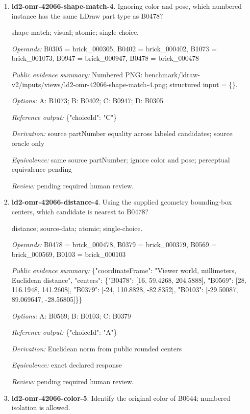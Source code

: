 \begin{enumerate}
\item \textbf{ld2-omr-42066-shape-match-4}. Ignoring color and pose, which numbered instance has the same LDraw part type as B0478?
\par{\small shape-match; visual; atomic; single-choice.\par\textit{Operands:} B0305 = brick\_000305, B0402 = brick\_000402, B1073 = brick\_001073, B0947 = brick\_000947, B0478 = brick\_000478\par\textit{Public evidence summary:} Numbered PNG: benchmark/ldraw-v2/inputs/views/ld2-omr-42066-shape-match-4.png; structured input = \{\}.\par\textit{Options:} A: B1073; B: B0402; C: B0947; D: B0305\par\textit{Reference output:} \{"choiceId": "C"\}\par\textit{Derivation:} source partNumber equality across labeled candidates; source oracle only\par\textit{Equivalence:} same source partNumber; ignore color and pose; perceptual equivalence pending\par\textit{Review:} pending required human review.}
\item \textbf{ld2-omr-42066-distance-4}. Using the supplied geometry bounding-box centers, which candidate is nearest to B0478?
\par{\small distance; source-data; atomic; single-choice.\par\textit{Operands:} B0478 = brick\_000478, B0379 = brick\_000379, B0569 = brick\_000569, B0103 = brick\_000103\par\textit{Public evidence summary:} \{"coordinateFrame": "Viewer world, millimeters, Euclidean distance", "centers": \{"B0478": [16, 59.4268, 204.5888], "B0569": [28, 116.1948, 141.2608], "B0379": [-24, 110.8828, -82.8352], "B0103": [-29.50087, 89.069647, -28.56805]\}\}\par\textit{Options:} A: B0569; B: B0103; C: B0379\par\textit{Reference output:} \{"choiceId": "A"\}\par\textit{Derivation:} Euclidean norm from public rounded centers\par\textit{Equivalence:} exact declared response\par\textit{Review:} pending required human review.}
\item \textbf{ld2-omr-42066-color-5}. Identify the original color of B0644; numbered isolation is allowed.

\end{enumerate}
